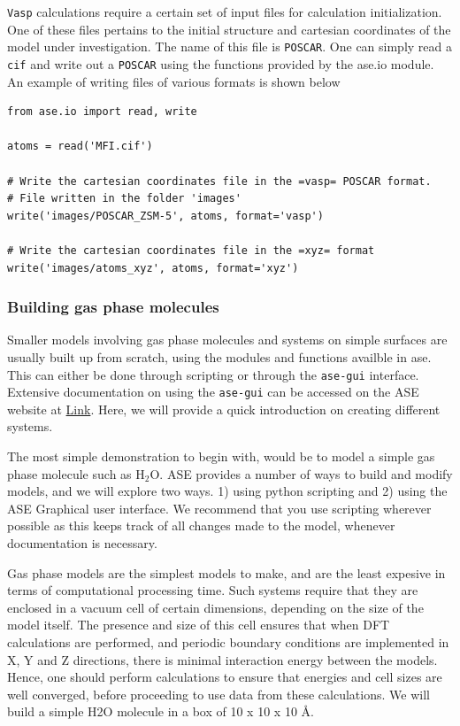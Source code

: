 \documentclass[11pt]{article}
\begin{document}
\texttt{Vasp} calculations require a certain set of input files for calculation initialization. One of these files pertains to the initial structure and cartesian coordinates of the model under investigation. The name of this file is \texttt{POSCAR}. One can simply read a \texttt{cif} and write out a \texttt{POSCAR} using the functions provided by the ase.io module. An example of writing files of various formats is shown below

\begin{verbatim}
from ase.io import read, write

atoms = read('MFI.cif')

# Write the cartesian coordinates file in the =vasp= POSCAR format.
# File written in the folder 'images'
write('images/POSCAR_ZSM-5', atoms, format='vasp')

# Write the cartesian coordinates file in the =xyz= format
write('images/atoms_xyz', atoms, format='xyz')
\end{verbatim}

\subsubsection{Building gas phase molecules}
\label{sec-2-3-3}
Smaller models involving gas phase molecules and systems on simple surfaces are usually built up from scratch, using the modules and functions availble in ase. This can either be done through scripting or through the \texttt{ase-gui} interface. Extensive documentation on using the \texttt{ase-gui} can be accessed on the ASE website at \href{https://wiki.fysik.dtu.dk/ase/ase/gui/gui.html}{Link}. Here, we will provide a quick introduction on creating different systems.

The most simple demonstration to begin with, would be to model a simple gas phase molecule such as H$_{\text{2}}$O. ASE provides a number of ways to build and modify models, and we will explore two ways. 1) using python scripting and 2) using the ASE Graphical user interface. We recommend that you use scripting wherever possible as this keeps track of all changes made to the model, whenever documentation is necessary. 

Gas phase models are the simplest models to make, and are the least expesive in terms of computational processing time. Such systems require that they are enclosed in a vacuum cell of certain dimensions, depending on the size of the model itself. The presence and size of this cell ensures that when DFT calculations are performed, and periodic boundary conditions are implemented in X, Y and Z directions, there is minimal interaction energy between the models. Hence, one should perform calculations to ensure that energies and cell sizes are well converged, before proceeding to use data from these calculations.
We will build a simple H2O molecule in a box of 10 x 10 x 10 \AA{}. 
\end{document}
